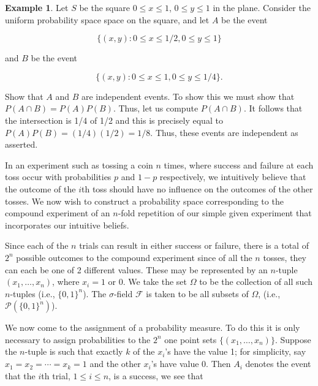 \documentclass{article}
\theoremstyle{definition}
\theoremstyle{remark}
\theoremstyle{definition}
\newtheorem{example}{Example}[section]
\begin{document}
    \begin{example}
        Let $S$ be the square $0\leq x\leq 1$, $0\leq y\leq 1$ in the plane. Consider the uniform probability space space on the square, and let $A$ be the event 
        
        \begin{equation*}
            \{(x,y)\colon 0\leq x\leq 1/2, 0\leq y\leq 1\}
        \end{equation*}
        
        \noindent and $B$ be the event 
        
        \begin{equation*}
            \{(x,y)\colon 0\leq x\leq 1, 0\leq y\leq 1/4\}.
        \end{equation*}
        
        \noindent Show that $A$ and $B$ are independent events. To show this we must show that $P(A\cap B)=P(A)P(B)$. Thus, let us compute $P(A\cap B)$. It follows that the intersection is 1/4 of 1/2 and this is precisely equal to $P(A)P(B)=(1/4)(1/2)=1/8$. Thus, these events are independent as asserted.
    \end{example}
    
    In an experiment such as tossing a coin $n$ times, where success and failure at each toss occur with probabilities $p$ and $1-p$ respectively, we intuitively believe that the outcome of the $i$th toss should have no influence on the outcomes of the other tosses. We now wish to construct a probability space corresponding to the compound experiment of an $n$-fold repetition of our simple given experiment that incorporates our intuitive beliefs. \par Since each of the $n$ trials can result in either success or failure, there is a total of $2^n$ possible outcomes to the compound experiment since of all the $n$ tosses, they can each be one of 2 different values. These may be represented by an $n$-tuple $(x_1,\dots,x_n)$, where $x_i=1$ or 0. We take the set $\Omega$ to be the collection of all such $n$-tuples (i.e., $\{0,1\}^n$). The $\sigma$-field $\mathcal{F}$ is taken to be all subsets of $\Omega$, (i.e., $\mathcal{P}(\{0,1\}^n)$). \par We now come to the assignment of a probability measure. To do this it is only necessary to assign probabilities to the $2^n$ one point sets $\{(x_1, \dots,x_n)\}$. Suppose the $n$-tuple is such that exactly $k$ of the $x_i$'s have the value 1; for simplicity, say $x_1=x_2=\cdots=x_k=1$ and the other $x_i$'s have value 0. Then $A_i$ denotes the event that the $i$th trial, $1\leq i\leq n$, is a success, we see that 
    
\end{document}
